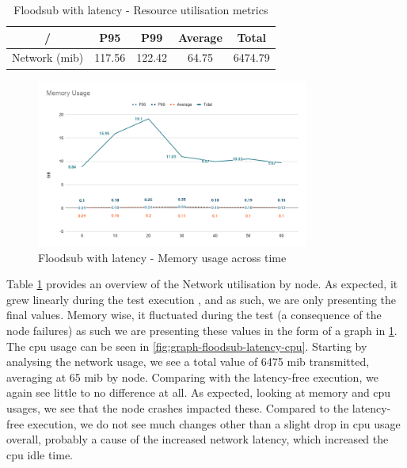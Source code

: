 \begin{table}[!htb]
\caption{Floodsub with latency - Resource utilisation metrics}
\label{table:floodsub-latency}
  \begin{center}
   \begin{tabular}{|c| c c c c|} 
   \hline
   / & P95 & P99 & Average & Total \\ [0.5ex] 
   \hline\hline
   Network (\acrshort{mib}) & 117.56 & 122.42 & 64.75 & 6474.79 \\
   \hline
  \end{tabular}
  \end{center}
\end{table}

\begin{figure}[!htb]
  \centering
  \includegraphics[width=0.8\textwidth]{img/graph-floodsub-latency-memory.png}
  \caption{Floodsub with latency - Memory usage across time}
  \label{fig:graph-floodsub-latency-memory}
\end{figure}

Table \ref{table:floodsub-latency} provides an overview of the Network
utilisation by node. As expected, it grew linearly during the test execution ,
and as such, we are only presenting the final values. Memory wise, it
fluctuated during the test (a consequence of the node failures) as such we are
presenting these values in the form of a graph in
\ref{fig:graph-floodsub-latency-memory}.  The \acrshort{cpu} usage can be seen
in \ref{fig:graph-floodsub-latency-cpu}. Starting by analysing the network
usage, we see a total value of 6475 \acrshort{mib} transmitted, averaging at 65
\acrshort{mib} by node.  Comparing with the latency-free execution, we again
see little to no difference at all. As expected, looking at memory and
\acrshort{cpu} usages, we see that the node crashes impacted these. Compared to
the latency-free execution, we do not see much changes other than a slight drop
in \acrshort{cpu} usage overall, probably a cause of the increased network
latency, which increased the \acrshort{cpu} idle time.

